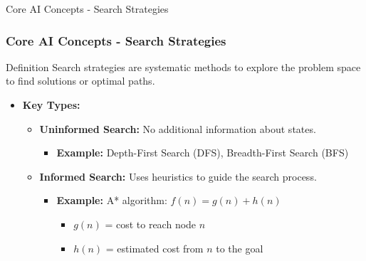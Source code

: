 \documentclass[aspectratio=169]{beamer}
\begin{document}
\begin{frame}[fragile]{Core AI Concepts - Search Strategies}
    \frametitle{Core AI Concepts - Search Strategies}
    \begin{block}{Definition}
        Search strategies are systematic methods to explore the problem space to find solutions or optimal paths.
    \end{block}
    
    \begin{itemize}
        \item \textbf{Key Types:}
        \begin{itemize}
            \item \textbf{Uninformed Search:} No additional information about states.
                \begin{itemize}
                    \item \textbf{Example:} Depth-First Search (DFS), Breadth-First Search (BFS)
                \end{itemize}
            \item \textbf{Informed Search:} Uses heuristics to guide the search process.
                \begin{itemize}
                    \item \textbf{Example:} A* algorithm: \( f(n) = g(n) + h(n) \)
                    \begin{itemize}
                        \item \( g(n) \) = cost to reach node \( n \)
                        \item \( h(n) \) = estimated cost from \( n \) to the goal
                    \end{itemize}
                \end{itemize}
        \end{itemize}
    \end{itemize}
\end{frame}
\end{document}
